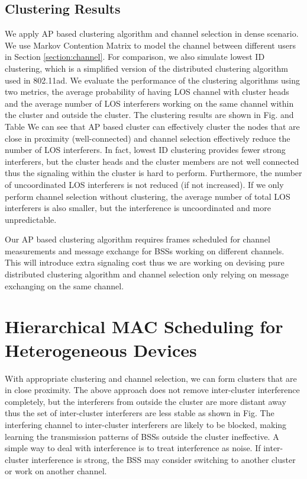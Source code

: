 \documentclass[10pt, conference, letterpaper]{IEEEtran}
\begin{document}
\subsection{Clustering Results}\label{subsection:cluster_result}
We apply AP based clustering algorithm and channel selection in dense scenario. We use Markov Contention Matrix to model the channel between different users in Section \ref{section:channel}. For comparison, we also simulate lowest ID clustering, which is a simplified version of the distributed clustering algorithm used in 802.11ad. We evaluate the performance of the clustering algorithms using two metrics, the average probability of having LOS channel with cluster heads and the average number of LOS interferers working on the same channel within the cluster and outside the cluster. The clustering results are shown in Fig. %
and Table %
We can see that AP based cluster can effectively cluster the nodes that are close in proximity (well-connected) and channel selection effectively reduce the number of LOS interferers. In fact, lowest ID clustering provides fewer strong interferers, but the cluster heads and the cluster members are not well connected thus the signaling within the cluster is hard to perform. Furthermore, the number of uncoordinated LOS interferers is not reduced (if not increased). If we only perform channel selection without clustering, the average number of total LOS interferers is also smaller, but the interference is uncoordinated and more unpredictable.

Our AP based clustering algorithm requires frames scheduled for channel measurements and message exchange for BSSs working on different channels. This will introduce extra signaling cost thus we are working on devising pure distributed clustering algorithm and channel selection only relying on message exchanging on the same channel.

\section{Hierarchical MAC Scheduling for Heterogeneous Devices}\label{section:MAC}
With appropriate clustering and channel selection, we can form clusters that are in close proximity. The above approach does not remove inter-cluster interference completely, but the interferers from outside the cluster are more distant away thus the set of inter-cluster interferers are less stable as shown in Fig. %
The interfering channel to inter-cluster interferers are likely to be blocked, making learning the transmission patterns of BSSs outside the cluster ineffective. A simple way to deal with interference is to treat interference as noise. If inter-cluster interference is strong, the BSS may consider switching to another cluster or work on another channel. 
\end{document}
